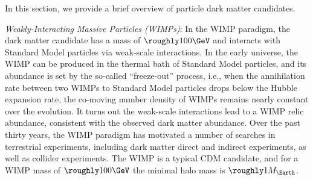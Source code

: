 In this section, we provide a brief overview of particle dark matter candidates.

{\it Weakly-Interacting Massive Particles (WIMPs)}: In the WIMP paradigm, the dark matter candidate has a mass of $\roughly 100 \GeV$ and interacts with Standard Model particles via weak-scale interactions. In the early universe, the WIMP can be produced in the thermal bath of Standard Model particles, and its abundance is set by the so-called “freeze-out” process, i.e., when the annihilation rate between two WIMPs to Standard Model particles drops below the Hubble expansion rate, the co-moving number density of WIMPs remains nearly constant over the evolution. It turns out the weak-scale interactions lead to a WIMP relic abundance, consistent with the observed dark matter abundance. Over the past thirty years, the WIMP paradigm has motivated a number of searches in terrestrial experiments, including dark matter direct and indirect experiments, as well as collider experiments. The WIMP is a typical CDM candidate, and for a WIMP mass of $\roughly 100 \GeV$ the minimal halo mass is $\roughly 1 M_\Earth$.

